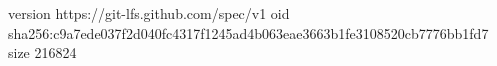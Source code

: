 version https://git-lfs.github.com/spec/v1
oid sha256:c9a7ede037f2d040fc4317f1245ad4b063eae3663b1fe3108520cb7776bb1fd7
size 216824
